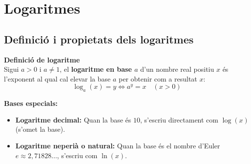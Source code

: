 \documentclass[12pt]{article}
\begin{document}
\newpage

\section{Logaritmes}

\subsection{Definició i propietats dels logaritmes}

\begin{concept}
\textbf{Definició de logaritme}\\
Sigui $a > 0$ i $a \neq 1$, el \textbf{logaritme en base $a$} d'un nombre real positiu $x$ és l'exponent al qual cal elevar la base $a$ per obtenir com a resultat $x$:
\[ \log_a(x) = y \iff a^y = x \quad (x > 0) \]

\begin{figure}[H]
\centering
{}

\end{figure}

\textbf{Bases especials:}
\begin{itemize}
    \item \textbf{Logaritme decimal:} Quan la base és $10$, s'escriu directament com $\log(x)$ (s'omet la base).
    \item \textbf{Logaritme neperià o natural:} Quan la base és el nombre d'Euler $e \approx 2{,}71828\dots$, s'escriu com $\ln(x)$.
\end{itemize}


\end{concept}
\end{document}
